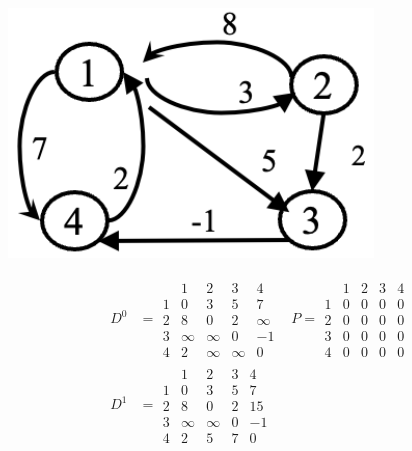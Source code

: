 \documentclass{article}
\begin{document}
\begin{multicols*}{2}
    \begin{center}
        \includegraphics[width=0.65\columnwidth]{floyd.png}
    \end{center}
    \begin{align*}
        D^0 & = \begin{array}{c|cccc}
                      & 1      & 2      & 3      & 4      \\
                    \hline
                    1 & 0      & 3      & 5      & 7      \\
                    2 & 8      & 0      & 2      & \infty \\
                    3 & \infty & \infty & 0      & -1     \\
                    4 & 2      & \infty & \infty & 0
                \end{array}
            & P = \begin{array}{c|cccc}
                        & 1 & 2 & 3 & 4 \\
                      \hline
                      1 & 0 & 0 & 0 & 0 \\
                      2 & 0 & 0 & 0 & 0 \\
                      3 & 0 & 0 & 0 & 0 \\
                      4 & 0 & 0 & 0 & 0
                  \end{array}                \\
        D^1 & = \begin{array}{c|cccc}
                      & 1      & 2      & 3 & 4  \\
                    \hline
                    1 & 0      & 3      & 5 & 7  \\
                    2 & 8      & 0      & 2 & 15 \\
                    3 & \infty & \infty & 0 & -1 \\
                    4 & 2      & 5      & 7 & 0
                \end{array}

\end{align*}
\end{multicols*}
\end{document}
